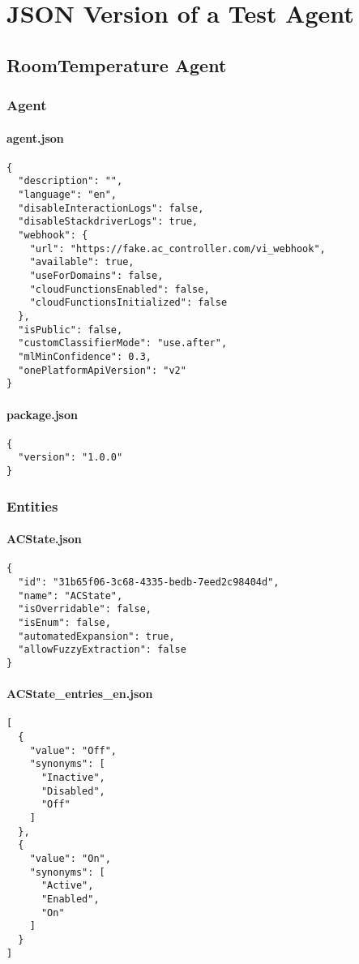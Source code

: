 \chapter{JSON Version of a Test Agent}
\section{RoomTemperature Agent}
\subsection{Agent}
\subsubsection{agent.json}
\begin{lstlisting}
{
  "description": "",
  "language": "en",
  "disableInteractionLogs": false,
  "disableStackdriverLogs": true,
  "webhook": {
    "url": "https://fake.ac_controller.com/vi_webhook",
    "available": true,
    "useForDomains": false,
    "cloudFunctionsEnabled": false,
    "cloudFunctionsInitialized": false
  },
  "isPublic": false,
  "customClassifierMode": "use.after",
  "mlMinConfidence": 0.3,
  "onePlatformApiVersion": "v2"
}
\end{lstlisting}
\subsubsection{package.json}
\begin{lstlisting}
{
  "version": "1.0.0"
}
\end{lstlisting}
\subsection{Entities}
\subsubsection{ACState.json}
\begin{lstlisting}
{
  "id": "31b65f06-3c68-4335-bedb-7eed2c98404d",
  "name": "ACState",
  "isOverridable": false,
  "isEnum": false,
  "automatedExpansion": true,
  "allowFuzzyExtraction": false
}	
\end{lstlisting}
\subsubsection{ACState\_entries\_en.json}
\begin{lstlisting}
[
  {
    "value": "Off",
    "synonyms": [
      "Inactive",
      "Disabled",
      "Off"
    ]
  },
  {
    "value": "On",
    "synonyms": [
      "Active",
      "Enabled",
      "On"
    ]
  }
]
\end{lstlisting}

